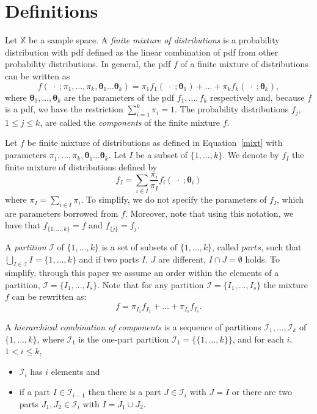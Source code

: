 \documentclass[10pt, a4paper]{article}
\newcommand{\m}[1]{\boldsymbol{#1}}
\begin{document}
\section{Definitions}
\label{definitions}

Let $\mathbb{X}$ be a sample space. A \emph{finite mixture of distributions} is a probability distribution with pdf defined as the linear combination of pdf from other probability distributions. In general, the pdf $f$ of a finite mixture of distributions can be written as
\begin{equation}\label{mixt}
f(\;\cdot\; ; \pi_1, \dots, \pi_k, \m\theta_1 \dots \m\theta_k) = \pi_1 f_1(\;\cdot\; ; \m\theta_1) + \dots + \pi_k f_k(\;\cdot\; ; \m\theta_k),
\end{equation}
where $\m\theta_1, \dots,  \m\theta_k$ are the parameters of the pdf $f_1, \dots, f_k$ respectively and, because $f$ is a pdf, we have the restriction $\sum_{i=1}^k \pi_i = 1$. The probability distributions $f_j$, $1 \leq j \leq k$, are called the \emph{components} of the finite mixture $f$.

Let $f$ be finite mixture of distributions as defined in Equation~\ref{mixt} with  parameters  $\pi_1, \dots, \pi_k, \m\theta_1 \dots \m\theta_k$. Let $I$  be a subset of $\{1, \dots, k\}$. We denote by $f_I$ the finite mixture of distributions defined by
\[
f_I = \sum_{i \in I} \frac{\pi_i}{\pi_I} f_i(\;\cdot\; ; \m\theta_i)
\]
where $\pi_I = \sum_{i \in I} \pi_i$. To simplify, we do not specify the parameters of $f_I$, which are parameters borrowed from $f$. Moreover, note that using this notation, we have that $f_{\{1, \dots, k\}} = f$ and $f_{\{j\}} = f_j$.

A \emph{partition} $\mathcal{I}$ of $\{1, \dots, k\}$ is a set of subsets of $\{1, \dots, k\}$, called $parts$, such that $\bigcup_{I \in \mathcal{I}} I = \{1, \dots, k\}$ and  if two parts $I$, $J$ are different, $I \cap J = \emptyset$ holds. To simplify, through this paper we assume an order within the elements of a partition, $\mathcal{I} = \{ I_1, \dots, I_s\}$. Note that for any partition $\mathcal{I} = \{ I_1, \dots, I_s\}$ the mixture $f$ can be rewritten as:
\[
f = \pi_{I_1} f_{I_1} + \dots + \pi_{I_s} f_{I_s}.
\]


A \emph{hierarchical combination of components} is a sequence of partitions $\mathcal{I}_1, \dots, \mathcal{I}_k$ of $\{1,...,k\}$, where $\mathcal{I}_1$ is the one-part partition $\mathcal{I}_1 = \{ \{1, \dots, k\} \}$, and for each $i$, $1 <  i \leq k$,
\begin{itemize}
\item $\mathcal{I}_i$ has $i$ elements  and
\item if a part $I \in \mathcal{I}_{i-1}$ then there is a part $J \in \mathcal{I}_i$ with $J = I$ or there are two parts $J_1, J_2 \in \mathcal{I}_i$ with $I = J_1 \cup J_2$.
\end{itemize}
\end{document}
